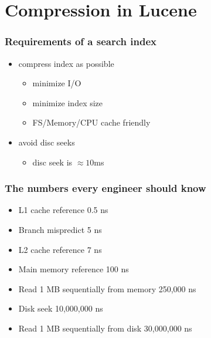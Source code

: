 \documentclass{beamer}
\begin{document}
  	\section{Compression in Lucene}
  	\begin{frame}
		\frametitle{Requirements of a search index}
		\begin{itemize}
		\item compress index as possible
			\begin{itemize}
			\item minimize I/O
			\item minimize index size
			\item FS/Memory/CPU cache friendly
			\end{itemize}
		\item avoid disc seeks
			\begin{itemize}
				\item disc seek is $\approx10$ms 
			\end{itemize}						
		\end{itemize}
  	\end{frame}	
  	\begin{frame}
  		\frametitle{The numbers every engineer should know}
  		\begin{itemize}
  		\item L1 cache reference 0.5 ns
  		\item Branch mispredict 5 ns
  		\item L2 cache reference 7 ns
  		\item Main memory reference 100 ns
  		\item Read 1 MB sequentially from memory 250,000 ns
  		\item Disk seek 10,000,000 ns
  		\item Read 1 MB sequentially from disk 30,000,000 ns
  		\end{itemize}
  	\end{frame}
\end{document}
